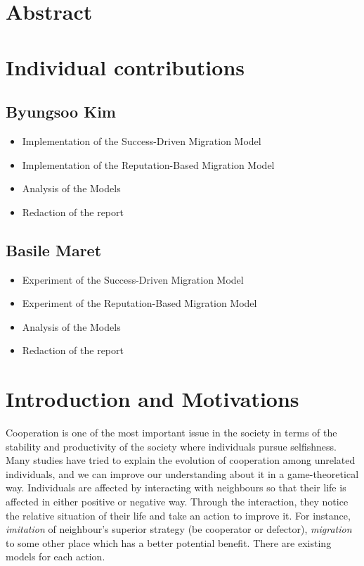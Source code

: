 \documentclass[11pt]{article}
\begin{document}
\newpage




\section{Abstract}

\newpage
\section{Individual contributions}
\subsection{Byungsoo Kim}
\begin{itemize}
\item Implementation of the Success-Driven Migration Model
\item Implementation of the Reputation-Based Migration Model
\item Analysis of the Models
\item Redaction of the report
\end{itemize}

\subsection{Basile Maret}
\begin{itemize}
\item Experiment of the Success-Driven Migration Model
\item Experiment of the Reputation-Based Migration Model
\item Analysis of the Models
\item Redaction of the report
\end{itemize}

\newpage
\section{Introduction and Motivations}

Cooperation is one of the most important issue in the society in terms of the stability and productivity of the society where individuals pursue selfishness. Many studies have tried to explain the evolution of cooperation among unrelated individuals, and we can improve our understanding about it in a game-theoretical way. Individuals are affected by interacting with neighbours so that their life is affected in either positive or negative way. Through the interaction, they notice the relative situation of their life and take an action to improve it. For instance, \textit{imitation} of neighbour's superior strategy (be cooperator or defector), \textit{migration} to some other place which has a better potential benefit. There are existing models for each action.
\end{document}

